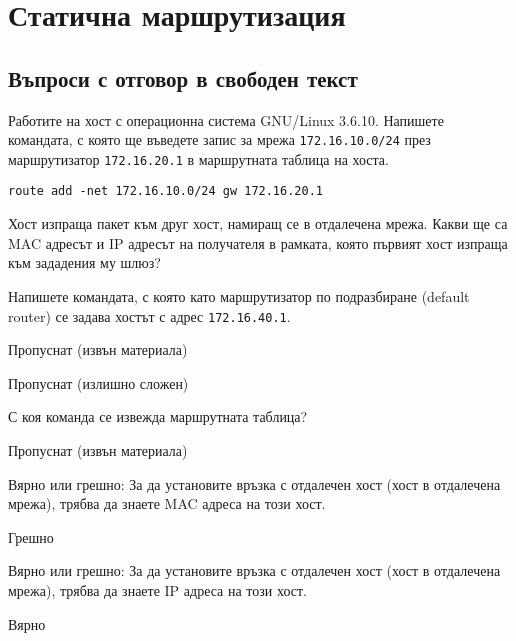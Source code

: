 \section{Статична маршрутизация}

\subsection{Въпроси с отговор в свободен текст}

\begin{q}
  Работите на хост с операционна система GNU/Linux 3.6.10. Напишете командата, с
  която ще въведете запис за мрежа \texttt{172.16.10.0/24} през маршрутизатор
  \texttt{172.16.20.1} в маршрутната таблица на хоста.

  \rans \texttt{route add -net 172.16.10.0/24 gw 172.16.20.1}
\end{q}

\begin{q}
  Хост изпраща пакет към друг хост, намиращ се в отдалечена мрежа. Какви ще са
  MAC адресът и IP адресът на получателя в рамката, която първият хост изпраща
  към зададения му шлюз?
\end{q}

\begin{q}
  Напишете командата, с която като маршрутизатор по подразбиране (default
  router) се задава хостът с адрес \texttt{172.16.40.1}.
\end{q}

\begin{q}
  Пропуснат (извън материала)
\end{q}

\begin{q}
  Пропуснат (излишно сложен)
\end{q}

\begin{q}
  С коя команда се извежда маршрутната таблица?
\end{q}

\begin{q}
  Пропуснат (извън материала)
\end{q}

\begin{q}
  Вярно или грешно: За да установите връзка с отдалечен хост (хост в отдалечена
  мрежа), трябва да знаете MAC адреса на този хост.

  \rans Грешно
\end{q}

\begin{q}
  Вярно или грешно: За да установите връзка с отдалечен хост (хост в отдалечена
  мрежа), трябва да знаете IP адреса на този хост.

  \rans Вярно
\end{q}

